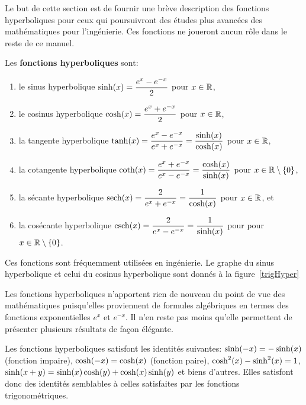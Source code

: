 {Le but de cette section est de fournir une brève description des
fonctions hyperboliques pour ceux qui poursuivront des études plus
avancées des mathématiques pour l'ingénierie.  Ces fonctions ne
joueront aucun rôle dans le reste de ce manuel.

Les {\bfseries fonctions hyperboliques} 
sont:
\begin{enumerate}
\item le sinus hyperbolique $\displaystyle \sinh(x) = \frac{e^x - e^{-x}}{2}$
pour $x\in \mathbb{R}$,
\item le cosinus hyperbolique $\displaystyle \cosh(x) = \frac{e^x + e^{-x}}{2}$
pour $x\in \mathbb{R}$,
\item la tangente hyperbolique $\displaystyle
\tanh(x) = \frac{e^x - e^{-x}}{e^x + e^{-x}} = \frac{\sinh(x)}{\cosh(x)}$
pour $x\in \mathbb{R}$,
\item la cotangente hyperbolique $\displaystyle
\coth(x) = \frac{e^x + e^{-x}}{e^x - e^{-x}} = \frac{\cosh(x)}{\sinh(x)}$
pour $x\in \mathbb{R}\setminus \{0\}$,
\item la sécante hyperbolique $\displaystyle
\operatorname{sech}(x) = \frac{2}{e^x + e^{-x}} = \frac{1}{\cosh(x)}$ pour $x\in \mathbb{R}$, et
\item la cosécante hyperbolique $\displaystyle
\operatorname{csch}(x) = \frac{2}{e^x - e^{-x}} = \frac{1}{\sinh(x)}$ pour
pour $x\in \mathbb{R}\setminus\{0\}$.
\end{enumerate}
Ces fonctions sont fréquemment utilisées en ingénierie.  Le graphe du
sinus hyperbolique et celui du cosinus hyperbolique sont donnés à la
figure~\ref{trigHyper}


Les fonctions hyperboliques n'apportent rien de nouveau du point de
vue des mathématiques puisqu'elles proviennent de formules algébriques
en termes des fonctions exponentielles $e^x$ et $e^{-x}$.  Il n'en
reste pas moins qu'elle permettent de présenter plusieurs résultats de
façon élégante.

Les fonctions hyperboliques satisfont les identités suivantes:
$\displaystyle \sinh(-x) = -\sinh(x)$ (fonction impaire),
$\displaystyle \cosh(-x) = \cosh(x)$ (fonction paire),
$\displaystyle \cosh^2(x) - \sinh^2(x) = 1$,
$\displaystyle \sinh(x+y) = \sinh(x) \cosh(y) + \cosh(x)\sinh(y)$ et
biens d'autres.  Elles satisfont donc des identités semblables à
celles satisfaites par les fonctions trigonométriques.

}
